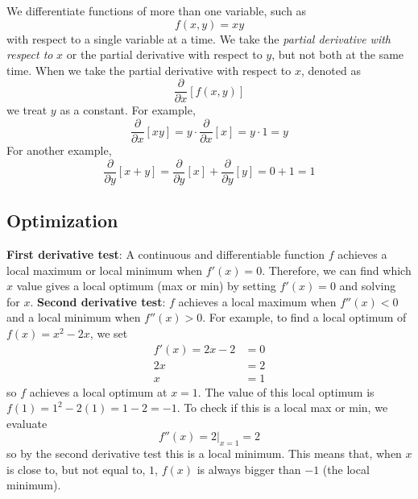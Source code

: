 We differentiate functions of more than one variable, such as 
\begin{equation*}
    f(x, y) = xy
\end{equation*}
with respect to a single variable at a time. We take the 
\textit{partial derivative with respect to} $x$ or the partial derivative with respect to $y$, 
but not both at the same time. When we take the partial derivative with respect to $x$, denoted 
as 
\begin{equation*}
    \frac{\partial}{\partial x} [f(x, y)]
\end{equation*}
we treat $y$ as a constant. For example,
\begin{equation*}
    \frac{\partial}{\partial x} [xy] = y \cdot  \frac{\partial}{\partial x} [x] = y \cdot 1 = y
\end{equation*}
For another example,
\begin{equation*}
    \frac{\partial}{\partial y} [x + y] = \frac{\partial}{\partial y} [x] + 
    \frac{\partial}{\partial y} [y] = 0 + 1 = 1
\end{equation*}

\subsection{Optimization}

\textbf{First derivative test}: A continuous and differentiable function $f$ achieves a local maximum or local minimum when $f'(x) = 0$. Therefore, we can find which $x$ value 
gives a local optimum (max or min) by setting $f'(x) = 0$ and solving for $x$. 
\textbf{Second derivative test}: $f$ achieves a local maximum when $f''(x) < 0$ and a local minimum when $f''(x) > 0$. For example, to find a local optimum of $f(x) = x^2 - 2x$, we set 
\begin{equation*}
    \begin{aligned}
        f'(x) = 2x - 2 & = 0 \\
        2x & = 2 \\ 
        x &= 1
    \end{aligned}
\end{equation*}
so $f$ achieves a local optimum at $x = 1$. The value of this local optimum is $f(1) = 1^2 - 2(1) = 1 - 2 = -1$. To check if this is a local max or min, we evaluate 
\begin{equation*}
    f''(x) = 2 \Big|_{x = 1} = 2
\end{equation*}
so by the second derivative test this is a local minimum. This means that, when $x$ is close to, but not equal to, $1$, $f(x)$ is always bigger than $-1$ (the local minimum).